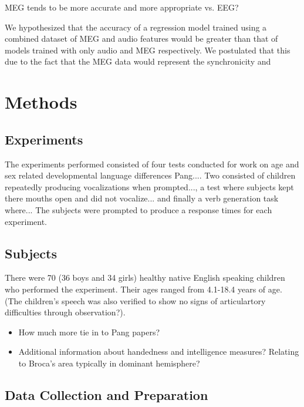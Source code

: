 \documentclass[a4paper]{article}
\begin{document}
MEG tends to be more accurate and more appropriate vs. EEG?

We hypothesized that the accuracy of a regression model trained using a combined dataset of MEG and audio features would be greater than that of models trained with only audio and MEG respectively. We postulated that this  due to the fact that the MEG data would represent the synchronicity and

\section{Methods}


\subsection{Experiments}

The experiments performed consisted of four tests conducted for work on age and sex related developmental language differences {Pang...}. Two consisted of children repeatedly producing vocalizations when prompted..., a test where subjects kept there mouths open and did not vocalize... and finally a verb generation task where... The subjects were prompted to produce a response  times for each experiment.

\subsection{Subjects}

There were 70 (36 boys and 34 girls) healthy native English speaking children who performed the experiment. Their ages ranged from 4.1-18.4 years of age. (The children's speech was also verified to show no signs of articulartory difficulties through observation?).

\begin{itemize}
\item How much more tie in to Pang papers?
\item Additional information about handedness and intelligence measures? Relating to Broca's area typically in dominant hemisphere?
\end{itemize}

\subsection{Data Collection and Preparation}
\end{document}
